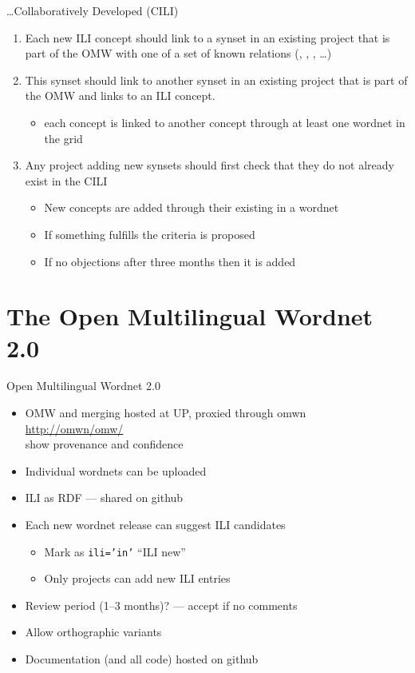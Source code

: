 \documentclass{beamer}
\begin{document}
\begin{frame}{\ldots Collaboratively Developed (CILI)}
\begin{enumerate}
\item\label{prov} Each new ILI concept should link to a synset in an existing project that is part of the OMW with one of a set of known relations (, , , \ldots) 
\item\label{link} This synset should link to another synset in an existing project that is part of the OMW and links to an ILI concept.
  \begin{itemize}
  \item[$\Rightarrow$]  each concept is linked to another concept through at least one wordnet in the grid
  \end{itemize}
\item\label{add} Any project adding new synsets should first check
  that they do not already exist in the CILI
  \begin{itemize}
  \item New concepts are added through their existing in a wordnet
  \item If something fulfills the criteria is proposed
  \item If no objections after three months then it is added
  \end{itemize}
\end{enumerate}

\end{frame}

\section{The Open Multilingual Wordnet 2.0}

\begin{frame}{Open Multilingual Wordnet 2.0}
\begin{itemize}
\item OMW and merging hosted at UP, proxied through omwn
  \\ \url{http://omwn/omw/}
  \\ show provenance and confidence
\item Individual wordnets can be uploaded
\item ILI as RDF --- shared on github
\item Each new wordnet release can suggest ILI candidates
  \begin{itemize}
  \item Mark as \texttt{ili='in'} ``ILI new''
  \item Only projects can add new ILI entries
  \end{itemize}
\item Review period (1--3 months)? --- accept if no comments
\item Allow orthographic variants
\item Documentation (and all code) hosted on github
\end{itemize}
\end{frame}
\end{document}
